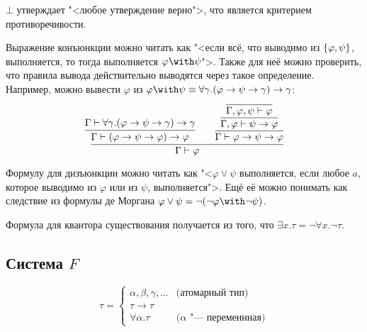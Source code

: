 $\bot$ утверждает "<любое утверждение верно">, что является критерием противоречивости.

Выражение конъюнкции можно читать как "<если всё, что выводимо из $\left\{\varphi,\psi\right\}$, выполняется,
то тогда выполняется $\varphi\with\psi$">.
Также для неё можно проверить, что правила вывода действительно выводятся через такое определение.
Например, можно вывести $\varphi$ из $\varphi\with\psi\equiv\forall\gamma.(\varphi\rightarrow\psi\rightarrow\gamma)\rightarrow\gamma$:
\[
    \infer{\Gamma \vdash \varphi}
    {
        \infer{\Gamma \vdash (\varphi\rightarrow\psi\rightarrow\varphi)\rightarrow\varphi}
            {\Gamma \vdash \forall \gamma.(\varphi\rightarrow\psi\rightarrow\gamma)\rightarrow\gamma}
        &&
        \infer{\Gamma\vdash\varphi\rightarrow\psi\rightarrow\varphi}
        {\infer{\Gamma,\varphi\vdash\psi\rightarrow\varphi}
        {\infer{\Gamma,\varphi,\psi\vdash\varphi}
        {}}}
    }
\]

Формулу для дизъюнкции можно читать как "<$\varphi \vee \psi$ выполняется,
если любое $a$, которое выводимо из $\varphi$ или из $\psi$, выполняется">.
Ещё её можно понимать как следствие из формулы де Моргана $\varphi\vee\psi=\neg(\neg\varphi\with\neg\psi)$.

Формула для квантора существования получается из того, что $\exists x . \tau = \neg \forall x . \neg \tau$.

\subsection{\texorpdfstring{Система $F$}{System F}}
\begin{definition}
\[
    \tau =
    \begin{cases}
        \alpha, \beta, \gamma, \ldots & \text{(атомарный тип)} \\
        \tau \rightarrow \tau \\
        \forall \alpha . \tau & \text{($\alpha$ "--- переменнная)}
    \end{cases}
\]
\end{definition}

